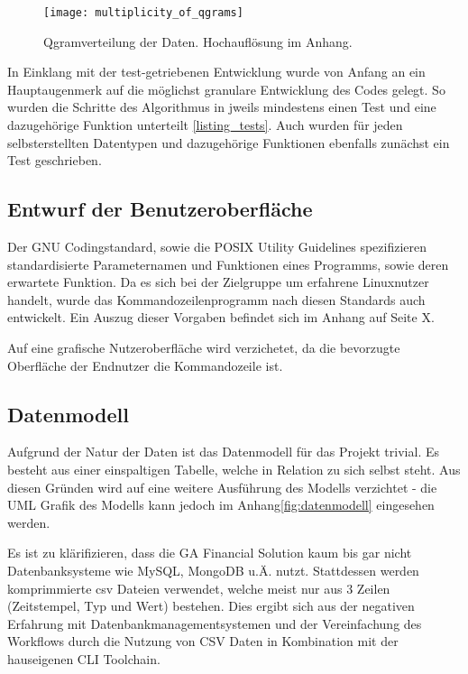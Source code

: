 \begin{figure}[!htp]
	\label{qgram_verteilung_klein}
	\caption{Qgramverteilung der Daten. Hochauflösung im Anhang.}
	\texttt{[image: multiplicity\_of\_qgrams]}
\end{figure}

In Einklang mit der test-getriebenen Entwicklung wurde von Anfang an ein Hauptaugenmerk
auf die möglichst granulare Entwicklung des Codes gelegt. So wurden die Schritte
des Algorithmus in jweils mindestens einen Test und eine dazugehörige Funktion unterteilt \ref{listing_tests}.
Auch wurden für jeden selbsterstellten Datentypen und dazugehörige Funktionen
ebenfalls zunächst ein Test geschrieben.



\subsection{Entwurf der Benutzeroberfläche}
Der GNU Codingstandard\cite{gnuCodingStandard},
sowie die POSIX Utility Guidelines\cite{posixGuidelines}
spezifizieren standardisierte Parameternamen und Funktionen eines Programms, sowie
deren erwartete Funktion. Da es sich bei der Zielgruppe um erfahrene Linuxnutzer handelt, wurde das
Kommandozeilenprogramm nach diesen Standards auch entwickelt. Ein Auszug dieser
Vorgaben befindet sich im Anhang auf Seite X.\par

Auf eine grafische Nutzeroberfläche wird verzichetet, da die bevorzugte
Oberfläche der Endnutzer die Kommandozeile ist.

\subsection{Datenmodell}
Aufgrund der Natur der Daten ist das Datenmodell für das Projekt trivial. Es besteht aus einer
einspaltigen Tabelle, welche in Relation zu sich selbst steht. Aus diesen Gründen wird auf eine weitere Ausführung des 
Modells verzichtet - die UML Grafik des Modells kann jedoch im Anhang\ref{fig:datenmodell} eingesehen werden.

Es ist zu klärifizieren, dass die GA Financial Solution kaum bis gar nicht Datenbanksysteme wie
MySQL, MongoDB u.Ä. nutzt. Stattdessen werden komprimmierte csv Dateien verwendet, welche
meist nur aus 3 Zeilen (Zeitstempel, Typ und Wert) bestehen. Dies ergibt sich aus
der negativen Erfahrung mit Datenbankmanagementsystemen und der Vereinfachung des Workflows durch
die Nutzung von CSV Daten in Kombination mit der hauseigenen CLI Toolchain.


